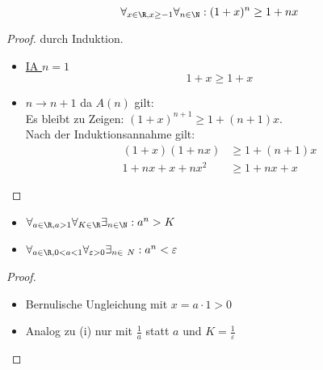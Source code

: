 \begin{theorem}
\[
\forall_{x \in  \R, x \ge -1} \forall_{n \in  \N}: (1+x)^{n} \ge 1 + nx   
\]
\end{theorem}
\begin{proof}
durch Induktion.
\begin{itemize}[label=$\lozenge$, itemsep=2ex]
	\item \underline{IA $n=1$}
		\[
		1+x \ge 1+x
		\]
	\item \underline{ $n \to n+1$}
		da $A(n)$ gilt: \\
		Es bleibt zu Zeigen: $(1+x)^{n+1} \ge 1+ (n+1)x$.\\
		Nach der Induktionsannahme gilt:
		\begin{align*}
			(1+x)(1+nx) &\ge 1 + (n+1)x \\
			1+nx+x+nx^{2} &\ge  1+nx+x
\end{align*}	
\end{itemize}
\end{proof}
\begin{corollary}
	\begin{itemize}
		\item $\forall_{a \in \R, a>1} \forall_{K \in \R } \exists_{n \in \N}: a^{n} > K $
	\item $\forall_{a \in \R, 0<a<1} \forall_{\varepsilon >0} \exists_{n \in  \ N} : a^{n} < \varepsilon  $  
	\end{itemize}
\end{corollary}
\begin{proof}
\begin{itemize}
	\item Bernulische Ungleichung mit $x=a\cdot 1 > 0$ 
	\item Analog zu (i) nur mit $\frac{1}{a}$ statt $a$ und $K=\frac{1}{\varepsilon}$   
\end{itemize}
\end{proof}

